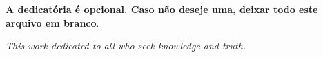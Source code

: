 \begin{dedicatoria}
   \vspace*{\fill}
   \centering
   \noindent
	\textbf{A dedicatória é opcional. Caso não deseje uma, deixar todo este
	arquivo em branco}.

   \textit{This work dedicated to all who seek knowledge and truth.} \vspace*{\fill}
\end{dedicatoria}
